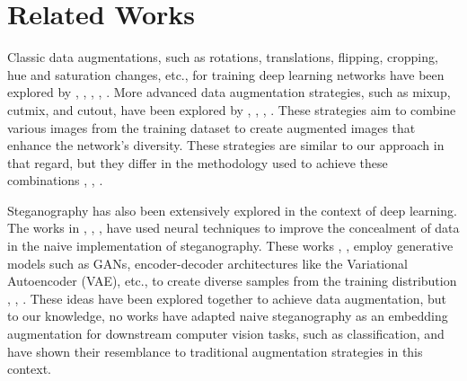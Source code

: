 \section{Related Works}
Classic data augmentations, such as rotations, translations, flipping, cropping, hue and saturation changes, etc., for training deep learning networks have been explored by \cite{7}, \cite{9}, \cite{24}, \cite{26}, \cite{27}. More advanced data augmentation strategies, such as mixup, cutmix, and cutout, have been explored by \cite{24}, \cite{25}, \cite{26}, \cite{30}. These strategies aim to combine various images from the training dataset to create augmented images that enhance the network's diversity. These strategies are similar to our approach in that regard, but they differ in the methodology used to achieve these combinations \cite{9}, \cite{6}, \cite{11}.

Steganography has also been extensively explored in the context of deep learning. The works in \cite{12}, \cite{13}, \cite{15}, \cite{16} have used neural techniques to improve the concealment of data in the naive implementation of steganography. These works \cite{18}, \cite{17}, \cite{22} employ generative models such as GANs, encoder-decoder architectures like the Variational Autoencoder (VAE), etc., to create diverse samples from the training distribution \cite{20}, \cite{21}, \cite{14}. These ideas have been explored together to achieve data augmentation, but to our knowledge, no works have adapted naive steganography as an embedding augmentation for downstream computer vision tasks, such as classification, and have shown their resemblance to traditional augmentation strategies in this context.